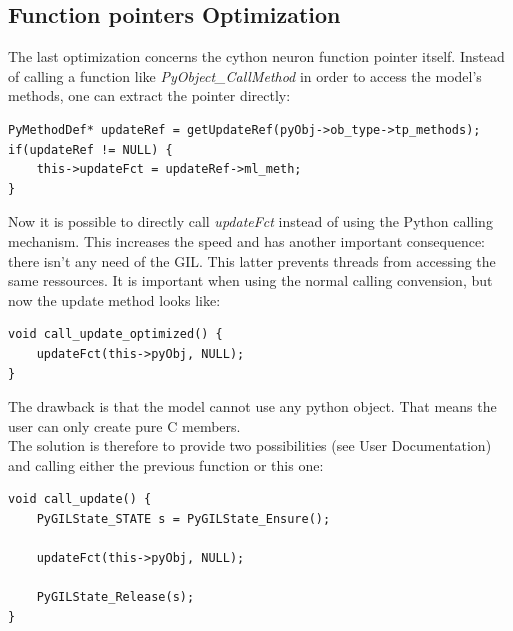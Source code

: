 \documentclass{article}
\begin{document}
\subsection{Function pointers Optimization}
The last optimization concerns the cython neuron function pointer itself. Instead of calling a function like \emph{PyObject\_CallMethod} in order to access the model's methods, one can extract the pointer directly:
\begin{verbatim}
PyMethodDef* updateRef = getUpdateRef(pyObj->ob_type->tp_methods);
if(updateRef != NULL) {
    this->updateFct = updateRef->ml_meth;
}
\end{verbatim}
Now it is possible to directly call \emph{updateFct} instead of using the Python calling mechanism. This increases the speed and has another important consequence: there isn't any need of the GIL. This latter prevents threads from accessing the same ressources. It is important when using the normal calling convension, but now the update method looks like:
\begin{verbatim}
void call_update_optimized() {
    updateFct(this->pyObj, NULL);
}
\end{verbatim}
The drawback is that the model cannot use any python object. That means the user can only create pure C members. \\
The solution is therefore to provide two possibilities (see User Documentation) and calling either the previous function or this one:
\begin{verbatim}
void call_update() {
    PyGILState_STATE s = PyGILState_Ensure();
	
    updateFct(this->pyObj, NULL);

    PyGILState_Release(s);
}
\end{verbatim}
\end{document}
